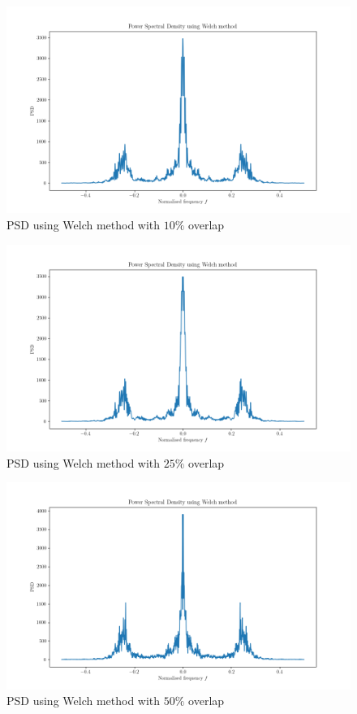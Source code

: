 \documentclass{article}
\begin{document}
\begin{figure}[!ht]
\includegraphics[width=\textwidth]{PSD_Welch_0.1.png}
\caption{PSD using Welch method with $10\%$ overlap}
\label{fig:psdw0.1}
\end{figure}

\begin{figure}[!ht]
\includegraphics[width=\textwidth]{PSD_Welch_0.25.png}
\caption{PSD using Welch method with $25\%$ overlap}
\label{fig:psdw0.25}
\end{figure}

\begin{figure}[!ht]
\includegraphics[width=\textwidth]{PSD_Welch_0.5.png}
\caption{PSD using Welch method with $50\%$ overlap}
\label{fig:psdw0.5}
\end{figure}
\clearpage
\end{document}
